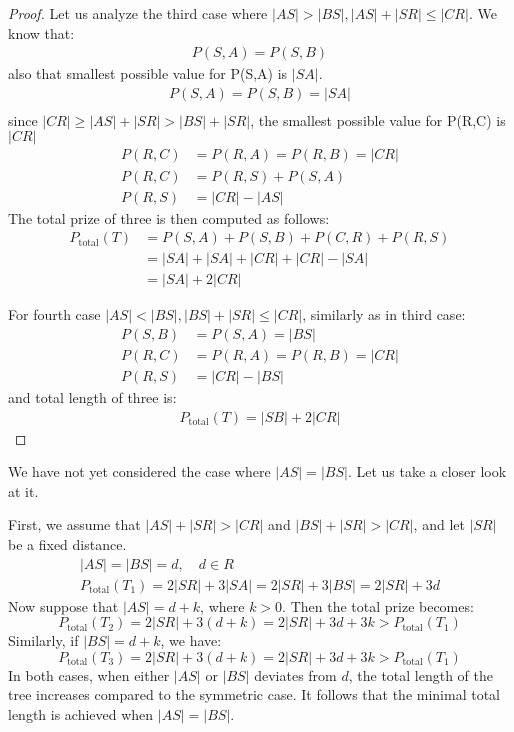 \documentclass[12pt]{article}
\newcommand{\Price}[2]{P(#1,#2)}
\newcommand{\Ptotal}[1]{P_{\text{total}}(#1)}
\newtheorem{proof}{Proof}
\begin{document}
\begin{proof}
	Let us analyze the third case where \( |AS| > |BS|, |AS|+|SR| \leq |CR| \).
	We know that:
	\begin{align*}
		\Price{S}{A} = \Price{S}{B}
	\end{align*}
	also that smallest possible value for \Price{S}{A} is \(|SA|\).
	\begin{align*}	
		\Price{S}{A} = \Price{S}{B} = |SA| \\
	\end{align*}
	since \(|CR| \geq |AS|+|SR| > |BS|+|SR| \), the smallest possible value for \Price{R}{C} is \(|CR|\)
	\begin{align*}
	 	\Price{R}{C} &= \Price{R}{A} = \Price{R}{B} = |CR| \\
	 	\Price{R}{C} &= \Price{R}{S} + \Price{S}{A} \\
	 	\Price{R}{S} &= |CR| - |AS|
	\end{align*}
	The total prize of three is then computed as follows:
	\begin{align*}	
		\Ptotal{T} &= \Price{S}{A} + \Price{S}{B} + \Price{C}{R} + \Price{R}{S} \\
		&= |SA| + |SA| + |CR| + |CR| - |SA| \\
		&= |SA| + 2 |CR|
	\end{align*}

	For fourth case \( |AS| < |BS|, |BS|+|SR| \leq |CR| \), similarly as in third case:
	\begin{align*}
		\Price{S}{B} &= \Price{S}{A} = |BS| \\
		\Price{R}{C} &= \Price{R}{A} = \Price{R}{B} = |CR| \\
	 	\Price{R}{S} &= |CR| - |BS|
	\end{align*}
	and total length of three is:
	\begin{align*}	
		\Ptotal{T} = |SB| + 2 |CR|
	\end{align*}
	\end{proof}	 
		 
	We have not yet considered the case where \( |AS| = |BS| \). Let us take a closer look at it. 
	
	First, we assume that \( |AS| + |SR| > |CR| \) and \( |BS| + |SR| > |CR| \), and let \( |SR| \) be a fixed distance.
	\begin{align*}
		|AS| = |BS| = d, \quad d \in R \\
		\Ptotal{T_1} = 2|SR| + 3|SA| = 2|SR| + 3|BS| = 2|SR| + 3d
	\end{align*}
	Now suppose that \( |AS| = d + k \), where \( k > 0 \). Then the total prize becomes:
	\[
	\Ptotal{T_2} = 2|SR| + 3(d + k) = 2|SR| + 3d + 3k > \Ptotal{T_1}
	\]
	Similarly, if \( |BS| = d + k \), we have:
	\[
	\Ptotal{T_3} = 2|SR| + 3(d + k) = 2|SR| + 3d + 3k > \Ptotal{T_1}
	\]
	In both cases, when either \( |AS| \) or \( |BS| \) deviates from \( d \), the total length of the tree increases compared to the symmetric case. It follows that the minimal total length is achieved when \( |AS| = |BS| \).
	
\end{document}
